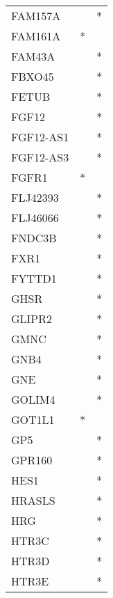 \begin{longtable}{lcc}
FAM157A          &                &          * \\
FAM161A          &              * &            \\
FAM43A           &                &          * \\
FBXO45           &                &          * \\
FETUB            &                &          * \\
FGF12            &                &          * \\
FGF12-AS1        &                &          * \\
FGF12-AS3        &                &          * \\
FGFR1            &              * &            \\
FLJ42393         &                &          * \\
FLJ46066         &                &          * \\
FNDC3B           &                &          * \\
FXR1             &                &          * \\
FYTTD1           &                &          * \\
GHSR             &                &          * \\
GLIPR2           &                &          * \\
GMNC             &                &          * \\
GNB4             &                &          * \\
GNE              &                &          * \\
GOLIM4           &                &          * \\
GOT1L1           &              * &            \\
GP5              &                &          * \\
GPR160           &                &          * \\
HES1             &                &          * \\
HRASLS           &                &          * \\
HRG              &                &          * \\
HTR3C            &                &          * \\
HTR3D            &                &          * \\
HTR3E            &                &          * \\

\end{longtable}
